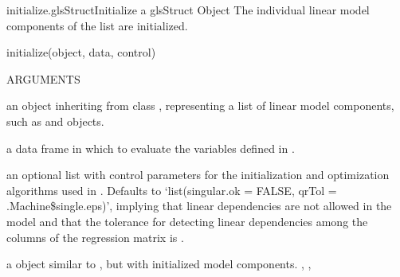 \documentclass[pdftex]{article} \usepackage{url,graphicx}
\begin{document}
\begin{Helpfile}{initialize.glsStruct}{Initialize a glsStruct Object}
The individual linear model components of the  list
are initialized.
\begin{Example}
initialize(object, data, control)
\end{Example}
\begin{Argument}{ARGUMENTS}
\item[\Co{object:}]
an object inheriting from class ,
representing a list of linear model components, such as
 and  objects.
\item[\Co{data:}]
a data frame in which to evaluate the variables defined in
.
\item[\Co{control:}]
an optional list with control parameters for the
initialization and optimization algorithms used in
. Defaults to `list(singular.ok = FALSE, qrTol =
     .Machine\$single.eps)', implying that linear dependencies are not
allowed in the model and that the tolerance for detecting linear
dependencies among the columns of the regression matrix is
.
\end{Argument}
a  object similar to , but with
initialized model components.
,  ,
\end{Helpfile}
\end{document}
